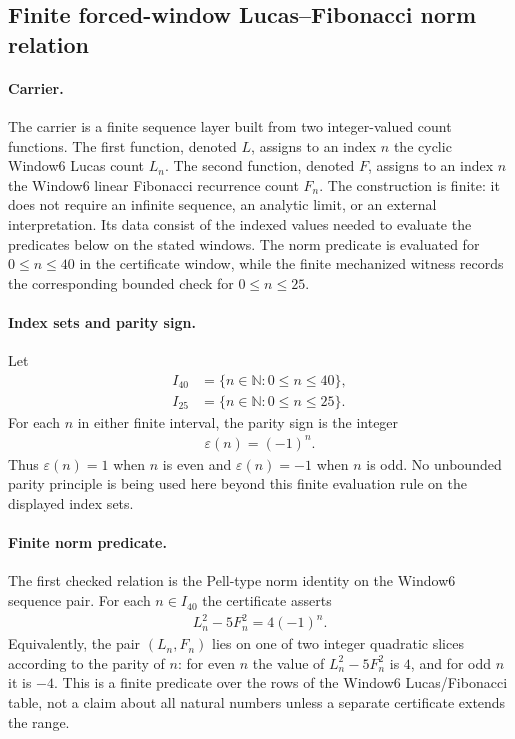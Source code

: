 
\subsection{Finite forced-window Lucas--Fibonacci norm relation}
\label{sec:window6-lucas-fib-norm-relation-law}

\paragraph{Carrier.}
The carrier is a finite sequence layer built from two integer-valued count functions.  The first function, denoted $L$, assigns to an index $n$ the cyclic Window6 Lucas count $L_n$.  The second function, denoted $F$, assigns to an index $n$ the Window6 linear Fibonacci recurrence count $F_n$.  The construction is finite: it does not require an infinite sequence, an analytic limit, or an external interpretation.  Its data consist of the indexed values needed to evaluate the predicates below on the stated windows.  The norm predicate is evaluated for $0 \leq n \leq 40$ in the certificate window, while the finite mechanized witness records the corresponding bounded check for $0 \leq n \leq 25$.

\paragraph{Index sets and parity sign.}
Let
$$
\begin{aligned}
I_{40} &= \{n \in \mathbb{N} : 0 \leq n \leq 40\},\\
I_{25} &= \{n \in \mathbb{N} : 0 \leq n \leq 25\}.
\end{aligned}
$$
For each $n$ in either finite interval, the parity sign is the integer
$$
\begin{aligned}
\varepsilon(n) = (-1)^n.
\end{aligned}
$$
Thus $\varepsilon(n)=1$ when $n$ is even and $\varepsilon(n)=-1$ when $n$ is odd.  No unbounded parity principle is being used here beyond this finite evaluation rule on the displayed index sets.

\paragraph{Finite norm predicate.}
The first checked relation is the Pell-type norm identity on the Window6 sequence pair.  For each $n \in I_{40}$ the certificate asserts
$$
\begin{aligned}
L_n^2 - 5F_n^2 = 4(-1)^n.
\end{aligned}
$$
Equivalently, the pair $(L_n,F_n)$ lies on one of two integer quadratic slices according to the parity of $n$: for even $n$ the value of $L_n^2-5F_n^2$ is $4$, and for odd $n$ it is $-4$.  This is a finite predicate over the rows of the Window6 Lucas/Fibonacci table, not a claim about all natural numbers unless a separate certificate extends the range.

